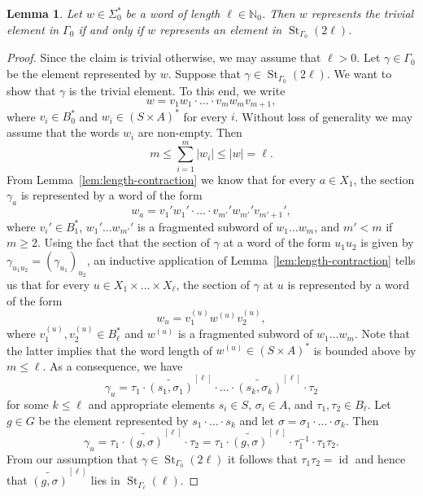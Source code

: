 \documentclass[a4paper]{amsart}
\renewcommand\leq\leqslant
\renewcommand\geq\geqslant
\numberwithin{equation}{section}
\newtheorem{lemma}[theorem]{Lemma}
\theoremstyle{definition}
\theoremstyle{remark}
\newcommand{\N}{\mathbb{N}}
\DeclareMathOperator{\id}{id}
\DeclareMathOperator{\St}{St}
\newcommand{\abs}[1]{| #1 |}
\begin{document}
\begin{lemma}\label{lem:effectiveness-via-stabilizer-quotients}
Let $w \in \Sigma_{0}^{\ast}$ be a word of length $\ell \in \N_0$.
Then $w$ represents the trivial element in $\Gamma_0$ if and only if $w$ represents an element in $\St_{\Gamma_{0}}(2\ell)$.
\end{lemma}
\begin{proof}
Since the claim is trivial otherwise, we may assume that $\ell > 0$.
Let $\gamma \in \Gamma_0$ be the element represented by $w$.
Suppose that $\gamma \in \St_{\Gamma_{0}}(2\ell)$.
We want to show that $\gamma$ is the trivial element.
To this end, we write
\[
w = v_1 w_{1} \cdot \ldots \cdot v_m w_{m} v_{m+1},
\]
where $v_i \in B_0^{\ast}$ and
$w_i \in (S \times A)^{\ast}$ for every $i$.
Without loss of generality we may assume that the words $w_{i}$ are non-empty.
Then
\[
m \leq \sum \limits_{i=1}^m \abs{w_i} \leq \abs{w} = \ell.
\]
From Lemma~\ref{lem:length-contraction} we know that for every $a \in X_1$, the section $\gamma_a$ is represented by a word of the form
\[
w_a = v_1' w_{1}' \cdot \ldots \cdot v_{m'}' w_{m'}' v_{m'+1}',
\]
where $v_i' \in B_1^{\ast}$, $w_{1}' \ldots w_{m'}'$ is a fragmented subword of $w_{1} \ldots w_{m}$, and $m' < m$ if $m \geq 2$.
Using the fact that the section of $\gamma$ at a word of the form $u_1u_2$ is given by $\gamma_{u_1u_2} = (\gamma_{u_1})_{u_2}$, an inductive application of Lemma~\ref{lem:length-contraction} tells us that for every $u \in X_1 \times \ldots \times X_{\ell}$, the section of $\gamma$ at $u$ is represented by a word of the form
\[
w_u = v_1^{(u)} w^{(u)} v_2^{(u)},
\]
where $v_1^{(u)},v_2^{(u)} \in B_{\ell}^{\ast}$ and $w^{(u)}$ is a fragmented subword of $w_{1} \ldots w_{m}$.
Note that the latter implies that the word length of $w^{(u)} \in (S \times A)^{\ast}$ is bounded above by $m \leq \ell$.
As a consequence, we have
\[
\gamma_{u}
= \tau_1 \cdot \widetilde{(s_1,\sigma_1)}^{[\ell]} \cdot \ldots \cdot \widetilde{(s_k,\sigma_k)}^{[\ell]} \cdot \tau_2
\]
for some $k \leq \ell$ and appropriate elements $s_i \in S$, $\sigma_i \in A$, and $\tau_1,\tau_2 \in B_{\ell}$.
Let $g \in G$ be the element represented by $s_1 \cdot \ldots \cdot s_k$ and let $\sigma = \sigma_1 \cdot \ldots \cdot \sigma_k$.
Then
\[
\gamma_{u}
= \tau_1 \cdot \widetilde{(g,\sigma)}^{[\ell]} \cdot \tau_2
= \tau_1 \cdot \widetilde{(g,\sigma)}^{[\ell]} \cdot \tau_1^{-1} \cdot \tau_1 \tau_2.
\]
From our assumption that $\gamma \in \St_{\Gamma_{0}}(2\ell)$ it follows that $\tau_1 \tau_2 = \id$ and hence that $\widetilde{(g,\sigma)}^{[\ell]}$ lies in $\St_{\Gamma_{\ell}}(\ell)$.

\end{proof}
\end{document}
